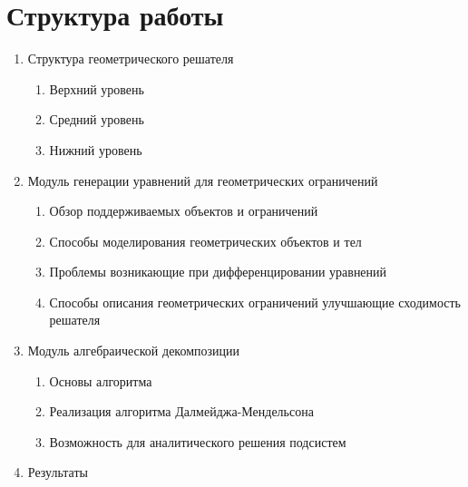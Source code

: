 \chapter{Структура работы}

\begin{enumerate}
    \item Структура геометрического решателя
        \begin{enumerate}
            \item Верхний уровень
            \item Средний уровень
            \item Нижний уровень
        \end{enumerate}
    \item Модуль генерации уравнений для геометрических ограничений
        \begin{enumerate}
            \item Обзор поддерживаемых объектов и ограничений
            \item Способы моделирования геометрических объектов и тел
            \item Проблемы возникающие при дифференцировании уравнений
            \item Способы описания геометрических ограничений улучшающие сходимость решателя
        \end{enumerate}
    \item Модуль алгебраической декомпозиции
        \begin{enumerate}
            \item Основы алгоритма
            \item Реализация алгоритма Далмейджа-Мендельсона
            \item Возможность для аналитического решения подсистем
        \end{enumerate}
    \item Результаты
\end{enumerate}